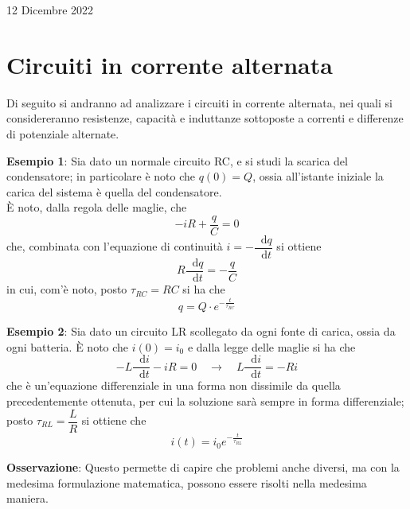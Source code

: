 \documentclass[a4paper]{extarticle}
\newcommand\dif{\mathop{}\!\mathrm{d}}
\begin{document}
\newpage
\noindent
\begin{center}
  12 Dicembre 2022
\end{center}
\section{Circuiti in corrente alternata}
Di seguito si andranno ad analizzare i circuiti in corrente alternata, nei quali si considereranno resistenze, capacità e induttanze sottoposte a correnti e differenze di potenziale alternate.

\vspace{2em}
\noindent
\textbf{Esempio 1}: Sia dato un normale circuito RC, e si studi la scarica del condensatore; in particolare è noto che $q(0)=Q$, ossia all'istante iniziale la carica del sistema è quella del condensatore.\\
È noto, dalla regola delle maglie, che 
\[-iR + \dfrac{q}{C} = 0\]
che, combinata con l'equazione di continuità $i=-\dfrac{\dif q}{\dif t}$ si ottiene
\[R \dfrac{\dif q}{\dif t} = - \dfrac{q}{C}\]
in cui, com'è noto, posto $\tau_{RC}=RC$ si ha che
\[q=Q \cdot e^{-\frac{t}{\tau_{RC}}}\]

\vspace{2em}
\noindent
\textbf{Esempio 2}: Sia dato un circuito LR scollegato da ogni fonte di carica, ossia da ogni batteria. È noto che $i(0)=i_0$ e dalla legge delle maglie si ha che
\[- L \dfrac{\dif i}{\dif t} - i R = 0 \hspace{1em} \rightarrow \hspace{1em} L \dfrac{\dif i}{\dif t} = - R i\]
che è un'equazione differenziale in una forma non dissimile da quella precedentemente ottenuta, per cui la soluzione sarà sempre in forma differenziale; posto $\tau_{RL}=\dfrac{L}{R}$ si ottiene che
\[i(t)=i_0 e^{-\frac{t}{\tau_{RL}}}\]

\vspace{2em}
\noindent
\textbf{Osservazione}: Questo permette di capire che problemi anche diversi, ma con la medesima formulazione matematica, possono essere risolti nella medesima maniera.

\vspace{1em}
\end{document}
